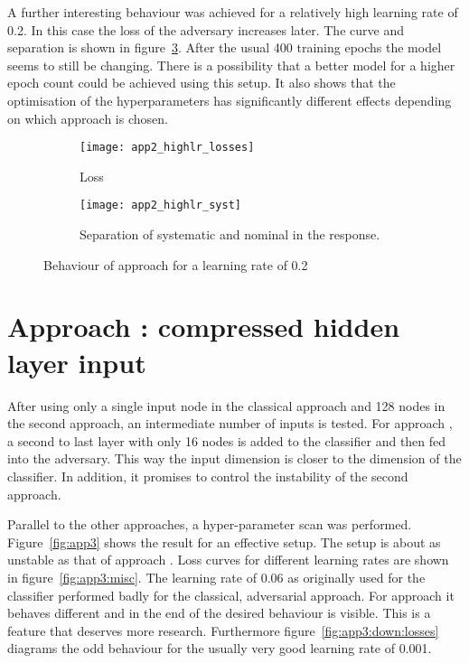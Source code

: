 A further interesting behaviour was achieved for a relatively high learning rate of \num{0.2}. In this case the loss of the adversary increases later. The curve and separation is shown in figure~\ref{fig:app2:highlr}. After the usual 400 training epochs the model seems to still be changing. There is a possibility that a better model for a higher epoch count could be achieved using this setup. It also shows that the optimisation of the hyperparameters has significantly different effects depending on which approach is chosen.

\begin{figure}[htbp]
    \centering
    \begin{subfigure}[b]{0.45\textwidth}
        \texttt{[image: app2\_highlr\_losses]}
        \caption{Loss}
        \label{fig:app2:highlr:losses}
    \end{subfigure}
\quad
    \begin{subfigure}[b]{0.45\textwidth}
        \texttt{[image: app2\_highlr\_syst]}
        \caption{Separation of systematic and nominal in the response.}
        \label{fig:app2:highlr:syst}
    \end{subfigure}
    \caption{Behaviour of approach  for a learning rate of \num{0.2}}
	\label{fig:app2:highlr}
\end{figure}

\section{Approach : compressed hidden layer input}

After using only a single input node in the classical approach and \num{128} nodes in the second approach, an intermediate number of inputs is tested. For approach , a second to last layer with only \num{16} nodes is added to the classifier and then fed into the adversary. This way the input dimension is closer to the dimension of the classifier. In addition, it promises to control the instability of the second approach.

Parallel to the other approaches, a hyper-parameter scan was performed.
Figure~\ref{fig:app3} shows the result for an effective setup. The setup is about as unstable as that of approach . Loss curves for different learning rates are shown in figure~\ref{fig:app3:misc}. The learning rate of \num{0.06} as originally used for the classifier performed badly for the classical, adversarial approach. For approach  it behaves different and in the end of the desired behaviour is visible. This is a feature that deserves more research. Furthermore figure~\ref{fig:app3:down:losses} diagrams the odd behaviour for the usually very good learning rate of \num{0.001}. 

